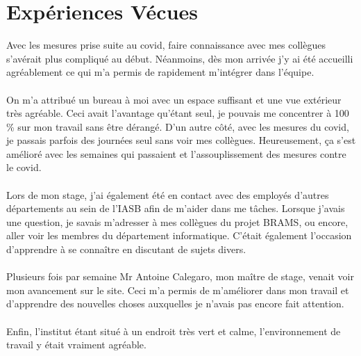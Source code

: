 \documentclass[11pt]{article}
\begin{document}
\newpage

\section{Expériences Vécues}

Avec les mesures prise suite au covid, faire connaissance avec mes collègues s'avérait plus compliqué au début.
Néanmoins, dès mon arrivée j'y ai été accueilli agréablement ce qui m'a permis de rapidement m'intégrer dans l'équipe.\\
\\
On m'a attribué un bureau à moi avec un espace suffisant et une vue extérieur très agréable.
Ceci avait l'avantage qu'étant seul, je pouvais me concentrer à 100 \% sur mon travail sans être dérangé.
D'un autre côté, avec les mesures du covid, je passais parfois des journées seul sans voir mes collègues.
Heureusement, ça s'est amélioré avec les semaines qui passaient et l'assouplissement des mesures contre le covid.\\
\\
Lors de mon stage, j'ai également été en contact avec des employés d'autres départements au sein de l'IASB afin de m'aider dans me tâches.
Lorsque j'avais une question, je savais m'adresser à mes collègues du projet BRAMS, ou encore, aller voir les membres du département informatique.
C'était également l'occasion d'apprendre à se connaître en discutant de sujets divers.\\
\\
Plusieurs fois par semaine Mr Antoine Calegaro, mon maître de stage, venait voir mon avancement sur le site.
Ceci m'a permis de m'améliorer dans mon travail et d'apprendre des nouvelles choses auxquelles je n'avais pas encore fait attention.\\
\\
Enfin, l'institut étant situé à un endroit très vert et calme, l'environnement de travail y était vraiment agréable.
\end{document}
